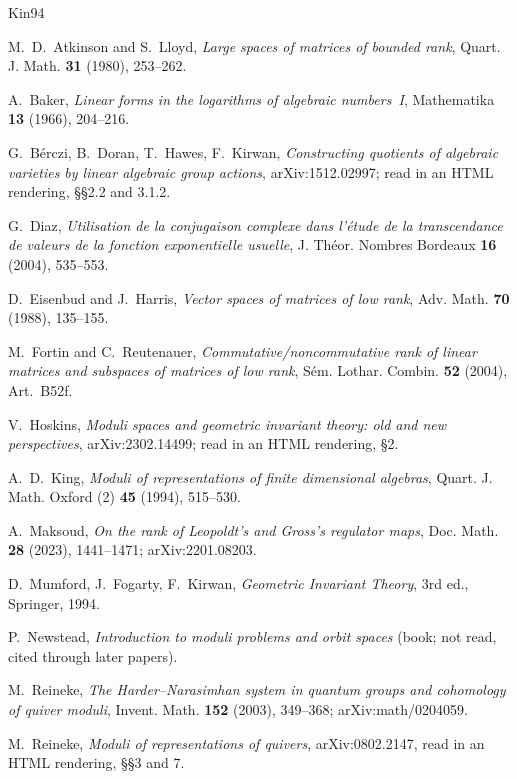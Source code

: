 \documentclass[11pt,a4paper]{article}
\theoremstyle{plain}
\theoremstyle{definition}
\begin{document}
\begin{thebibliography}{Kin94}

M.~D.~Atkinson and S.~Lloyd, \emph{Large spaces of matrices of bounded rank}, Quart. J. Math. \textbf{31} (1980), 253--262.

A.~Baker, \emph{Linear forms in the logarithms of algebraic numbers~I}, Mathematika \textbf{13} (1966), 204--216.

G.~B\'erczi, B.~Doran, T.~Hawes, F.~Kirwan, \emph{Constructing quotients of algebraic varieties by linear algebraic group actions}, arXiv:1512.02997; read in an HTML rendering, \S\S2.2 and 3.1.2.

G.~Diaz, \emph{Utilisation de la conjugaison complexe dans l'\'etude de la transcendance de valeurs de la fonction exponentielle usuelle}, J. Th\'eor. Nombres Bordeaux \textbf{16} (2004), 535--553.

D.~Eisenbud and J.~Harris, \emph{Vector spaces of matrices of low rank}, Adv. Math. \textbf{70} (1988), 135--155.

M.~Fortin and C.~Reutenauer, \emph{Commutative/noncommutative rank of linear matrices and subspaces of matrices of low rank}, S\'em. Lothar. Combin. \textbf{52} (2004), Art.~B52f.

V.~Hoskins, \emph{Moduli spaces and geometric invariant theory: old and new perspectives}, arXiv:2302.14499; read in an HTML rendering, \S2.

A.~D.~King, \emph{Moduli of representations of finite dimensional algebras}, Quart. J. Math. Oxford (2) \textbf{45} (1994), 515--530.

A.~Maksoud, \emph{On the rank of Leopoldt's and Gross's regulator maps}, Doc. Math. \textbf{28} (2023), 1441--1471; arXiv:2201.08203.

D.~Mumford, J.~Fogarty, F.~Kirwan, \emph{Geometric Invariant Theory}, 3rd ed., Springer, 1994.

P.~Newstead, \emph{Introduction to moduli problems and orbit spaces} (book; not read, cited through later papers).

M.~Reineke, \emph{The Harder--Narasimhan system in quantum groups and cohomology of quiver moduli}, Invent. Math. \textbf{152} (2003), 349--368; arXiv:math/0204059.

M.~Reineke, \emph{Moduli of representations of quivers}, arXiv:0802.2147, read in an HTML rendering, \S\S3 and 7.


\end{thebibliography}
\end{document}
